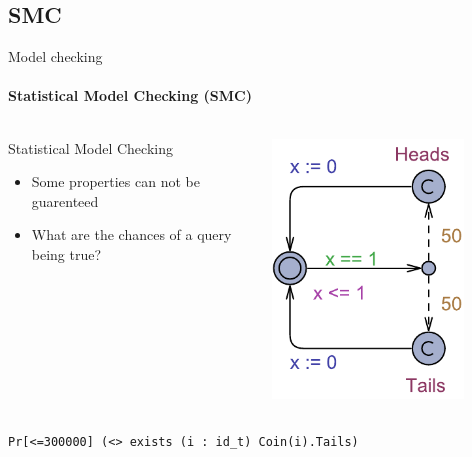 \subsection{SMC}
\begin{frame}[t]{Model checking}
	\framesubtitle{Statistical Model Checking (SMC)}
	\begin{columns}[T]
		\begin{column}{.48\textwidth}
			Statistical Model Checking
			\begin{itemize}
				\item<+-> Some properties can not be guarenteed
				\item<+-> What are the chances of a query being true?
			\end{itemize}
		\end{column}
		\begin{column}{.48\textwidth}
			\includegraphics[trim=0 200 0 200,width=0.8\textwidth]{images/Simple_SMC.pdf}
		\end{column}
	\end{columns}
	\vspace{80pt}
	\texttt{Pr[<=300000] (<> exists (i : id\_t) Coin(i).Tails)}
\end{frame}
